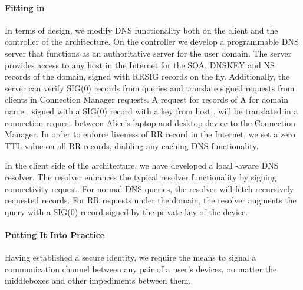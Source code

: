 
\paragraph{Fitting \dnssec in \signpost} In terms of \signpost design, we modify DNS
functionality both on the client and the controller of the architecture. On the
controller we develop a programmable DNS server that functions as
an authoritative server for the user domain. The server provides 
\dnssec access to any host in the Internet for the SOA, DNSKEY and NS records of the
domain, signed with RRSIG records on the fly. Additionally, the server
can verify SIG(0) records from queries and translate signed requests from
\signpost clients in Connection Manager requests. A request for records of A
for domain name , signed with a SIG(0) record with a
key from host , will be translated in a connection request
between Alice's laptop and desktop device to the Connection Manager.
In order to enforce liveness of RR record in the Internet, we set a zero TTL 
value on all RR records, diabling any caching DNS functionality.

In the client side of the \signpost architecture, we have developed a local
\signpost-aware DNS resolver. The resolver enhances the typical resolver
functionality by signing \signpost connectivity request. For normal DNS queries,
the resolver will fetch recursively requested records. For RR requests
under the \signpost domain, the resolver augments the query with a SIG(0) record
signed by the private key of the device. 


\paragraph{Putting It Into Practice} Having established a secure identity, we
require the means to signal a communication channel between any pair of a user's
devices, no matter the middleboxes and other impediments between them. 

